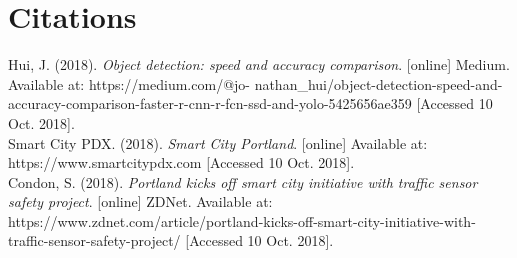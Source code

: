 \documentclass[letterpaper,10pt,draftclsnofoot,onecolumn]{IEEEtran}
\begin{document}
\section{Citations}
\noindent
[1] Hui, J. (2018). {\it Object detection: speed and accuracy comparison}. [online] Medium. Available at: https://medium.com/@jo- nathan\_hui/object-detection-speed-and-accuracy-comparison-faster-r-cnn-r-fcn-ssd-and-yolo-5425656ae359 [Accessed 10 Oct. 2018].\\
\noindent
[2] Smart City PDX. (2018). {\it Smart City Portland}. [online] Available at: https://www.smartcitypdx.com [Accessed 10 Oct. 2018].\\
\noindent
[3] Condon, S. (2018). {\it Portland kicks off smart city initiative with traffic sensor safety project}. [online] ZDNet. Available at: https://www.zdnet.com/article/portland-kicks-off-smart-city-initiative-with-traffic-sensor-safety-project/ [Accessed 10 Oct. 2018].
\end{document}
